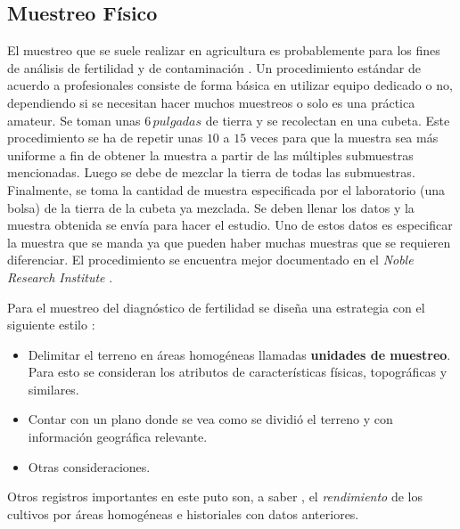 \documentclass[conference]{IEEEtran}
\begin{document}
\subsection{Muestreo Físico}

El muestreo que se suele realizar en agricultura es probablemente para los fines de análisis de fertilidad \cite{lassaga-2011} y de contaminación \cite{gobpe-ministerio-del-ambiente-2014}. Un procedimiento estándar de acuerdo a profesionales consiste de forma básica en utilizar equipo dedicado \cite{ministry-of-agriculture-food-and-fisheries-2020} o no, dependiendo si se necesitan hacer muchos muestreos o solo es una práctica amateur. Se toman unas $6 \, pulgadas$ de tierra y se recolectan en una cubeta. Este procedimiento se ha de repetir unas $10$ a $15$ veces para que la muestra sea más uniforme a fin de obtener la muestra a partir de las múltiples submuestras mencionadas. Luego se debe de mezclar la tierra de todas las submuestras. Finalmente, se toma la cantidad de muestra especificada por el laboratorio (una bolsa) de la tierra de la cubeta ya mezclada. Se deben llenar los datos y la muestra obtenida se envía para hacer el estudio. Uno de estos datos es especificar la muestra que se manda ya que pueden haber muchas muestras que se requieren diferenciar. El procedimiento se encuentra mejor documentado en el \textit{Noble Research Institute} \cite{funderburg-2014}.

\bigbreak

Para el muestreo del diagnóstico de fertilidad se diseña una estrategia con el siguiente estilo \cite{lassaga-2011}:

\begin{itemize}
    \item Delimitar el terreno en áreas homogéneas llamadas \textbf{unidades de muestreo}. Para esto se consideran los atributos de características físicas, topográficas y similares.
    
    \item Contar con un plano donde se vea como se dividió el terreno y con información geográfica relevante.
    
    \item Otras consideraciones.
\end{itemize}

Otros registros importantes en este puto son, a saber \cite{lassaga-2011}, el \textit{rendimiento} de los cultivos por áreas homogéneas e historiales con datos anteriores.

\bigbreak
\end{document}
